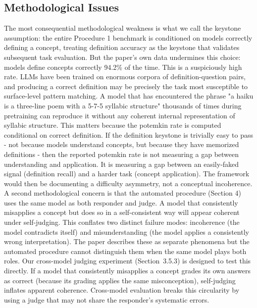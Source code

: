 \documentclass[sigconf,authordraft]{acmart}
\begin{document}
\subsection{Methodological Issues}
The most consequential methodological weakness is what we call the keystone assumption: the entire Procedure 1 benchmark is conditioned on models correctly defining a concept, treating definition accuracy as the keystone that validates subsequent task evaluation. But the paper's own data undermines this choice: models define concepts correctly 94.2\% of the time. This is a suspiciously high rate. LLMs have been trained on enormous corpora of definition-question pairs, and producing a correct definition may be precisely the task most susceptible to surface-level pattern matching. A model that has encountered the phrase "a haiku is a three-line poem with a 5-7-5 syllabic structure" thousands of times during pretraining can reproduce it without any coherent internal representation of syllabic structure.
This matters because the potemkin rate is computed conditional on correct definition. If the definition keystone is trivially easy to pass - not because models understand concepts, but because they have memorized definitions - then the reported potemkin rate is not measuring a gap between understanding and application. It is measuring a gap between an easily-faked signal (definition recall) and a harder task (concept application). The framework would then be documenting a difficulty asymmetry, not a conceptual incoherence.
A second methodological concern is that the automated procedure (Section 4) uses the same model as both responder and judge. A model that consistently misapplies a concept but does so in a self-consistent way will appear coherent under self-judging. This conflates two distinct failure modes: incoherence (the model contradicts itself) and misunderstanding (the model applies a consistently wrong interpretation). The paper describes these as separate phenomena but the automated procedure cannot distinguish them when the same model plays both roles.
Our cross-model judging experiment (Section~3.5.3) is designed to test this directly. If a model that consistently misapplies a concept grades its own answers as correct (because its grading applies the same misconception), self-judging inflates apparent coherence. Cross-model evaluation breaks this circularity by using a judge that may not share the responder's systematic errors.
\end{document}
